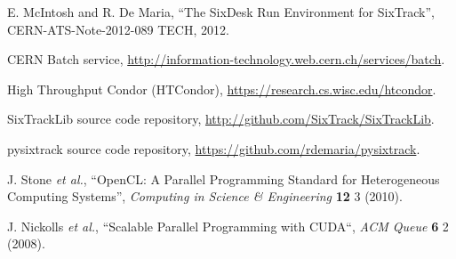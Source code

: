 \documentclass{ws-ijmpa}
\begin{document}
\begin{thebibliography}{99}
E. McIntosh and R. De Maria, ``The SixDesk Run Environment for SixTrack'', CERN-ATS-Note-2012-089 TECH, 2012.

CERN Batch service, \url{http://information-technology.web.cern.ch/services/batch}.

High Throughput Condor (HTCondor), \url{https://research.cs.wisc.edu/htcondor}.














SixTrackLib source code repository,
\url{http://github.com/SixTrack/SixTrackLib}.

pysixtrack source code repository,
\url{https://github.com/rdemaria/pysixtrack}.

J. Stone {\it et al.}, ``OpenCL: A Parallel Programming Standard for Heterogeneous Computing Systems'', {\it  Computing in Science \& Engineering} {\bf 12} 3 (2010).

J. Nickolls {\it et al.}, ``Scalable Parallel Programming with CUDA``, {\it ACM Queue} {\bf 6} 2 (2008).

\end{thebibliography}
\null 
\end{document}

